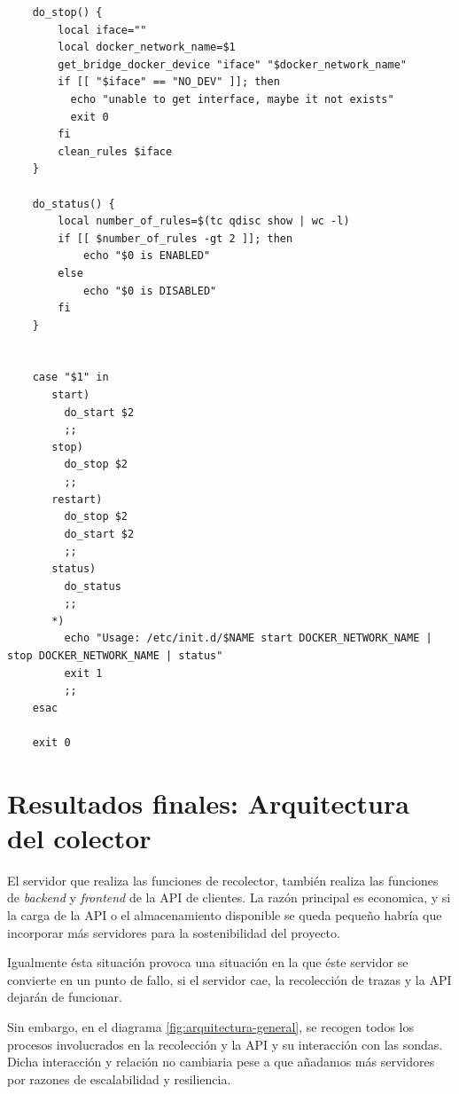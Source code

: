 \begin{verbatim}
    do_stop() {
        local iface=""
        local docker_network_name=$1
        get_bridge_docker_device "iface" "$docker_network_name"
        if [[ "$iface" == "NO_DEV" ]]; then
          echo "unable to get interface, maybe it not exists"
          exit 0
        fi
        clean_rules $iface
    }
    
    do_status() {
        local number_of_rules=$(tc qdisc show | wc -l)
        if [[ $number_of_rules -gt 2 ]]; then
            echo "$0 is ENABLED"
        else
            echo "$0 is DISABLED"
        fi
    }
    
    
    case "$1" in
       start)
         do_start $2
         ;;
       stop)
         do_stop $2
         ;;
       restart)
         do_stop $2
         do_start $2
         ;;
       status)
         do_status
         ;;
       *)
         echo "Usage: /etc/init.d/$NAME start DOCKER_NETWORK_NAME | stop DOCKER_NETWORK_NAME | status"
         exit 1
         ;;
    esac
    
    exit 0    
\end{verbatim}
\bigskip


\section{Resultados finales: Arquitectura del colector}

El servidor que realiza las funciones de recolector, también realiza las funciones
de \emph{backend} y \emph{frontend} de la API de clientes. La razón principal
es economica, y si la carga de la API o el almacenamiento disponible se queda pequeño
habría que incorporar más servidores para la sostenibilidad del proyecto.

Igualmente ésta situación provoca una situación en la que éste servidor se convierte en un 
punto de fallo, si el servidor cae, la recolección de trazas y la API dejarán de funcionar.

Sin embargo, en el diagrama \ref{fig:arquitectura-general}, se recogen todos los procesos involucrados
en la recolección y la API y su interacción con las sondas. Dicha interacción y relación no cambiaria pese
a que añadamos más servidores por razones de escalabilidad y resiliencia.

